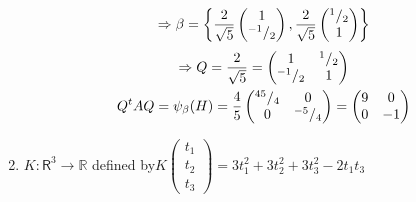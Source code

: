 \begin{enumerate}
\begin{align}
\end{align}
\begin{equation}
\Rightarrow \beta =
\left\{\frac{2}{\sqrt{5}}\begin{pmatrix}1\\^{-1}/_{2} \end{pmatrix},
 \frac{2}{\sqrt{5}}\begin{pmatrix}^{1}/_{2}\\1\end{pmatrix}\right\}
\end{equation}
\begin{gather}
\Rightarrow Q = 
\frac{2}{\sqrt{5}} = \begin{pmatrix}
1 & ^{1}/_{2}\\
^{-1}/_{2} & 1
\end{pmatrix}\\
Q^tAQ = \psi_\beta(H) = \frac{4}{5}\begin{pmatrix}
^{45}/_{4} & 0\\
0 & ^{-5}/_{4}
\end{pmatrix}
= \begin{pmatrix}
9 & 0\\
0 & -1
\end{pmatrix}
\end{gather}
\item $K\colon \mathsf{R}^3 \to \mathbb{R}$ defined
  by$K\begin{pmatrix}t_1\\t_2\\t_3\end{pmatrix} = 3t_1^2 +3t_2^2 +
  3t_3^2 -2t_1t_3$ 


\end{enumerate}
